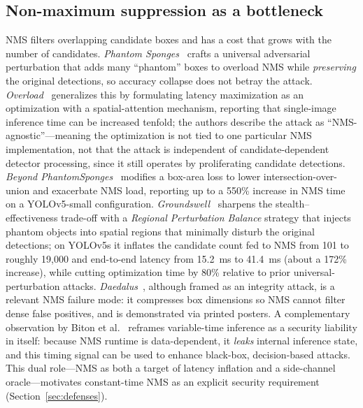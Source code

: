 \documentclass[acmsmall,screen,review,nonacm]{acmart}
\begin{document}
\subsection{Non-maximum suppression as a bottleneck}
NMS filters overlapping candidate boxes and has a cost that grows with the number of candidates. \emph{Phantom Sponges}~\cite{shapira2023phantom} crafts a universal adversarial perturbation that adds many ``phantom'' boxes to overload NMS while \emph{preserving} the original detections, so accuracy collapse does not betray the attack. \emph{Overload}~\cite{chen2024overload} generalizes this by formulating latency maximization as an optimization with a spatial-attention mechanism, reporting that single-image inference time can be increased tenfold; the authors describe the attack as ``NMS-agnostic''---meaning the optimization is not tied to one particular NMS implementation, not that the attack is independent of candidate-dependent detector processing, since it still operates by proliferating candidate detections. \emph{Beyond PhantomSponges}~\cite{schoof2024beyond} modifies a box-area loss to lower intersection-over-union and exacerbate NMS load, reporting up to a 550\% increase in NMS time on a YOLOv5-small configuration. \emph{Groundswell}~\cite{xia2026groundswell} sharpens the stealth--effectiveness trade-off with a \emph{Regional Perturbation Balance} strategy that injects phantom objects into spatial regions that minimally disturb the original detections; on YOLOv5s it inflates the candidate count fed to NMS from 101 to roughly 19{,}000 and end-to-end latency from 15.2~ms to 41.4~ms (about a 172\% increase), while cutting optimization time by 80\% relative to prior universal-perturbation attacks. \emph{Daedalus}~\cite{wang2019daedalus}, although framed as an integrity attack, is a relevant NMS failure mode: it compresses box dimensions so NMS cannot filter dense false positives, and is demonstrated via printed posters. A complementary observation by Biton et al.~\cite{biton2023timing} reframes variable-time inference as a security liability in itself: because NMS runtime is data-dependent, it \emph{leaks} internal inference state, and this timing signal can be used to enhance black-box, decision-based attacks. This dual role---NMS as both a target of latency inflation and a side-channel oracle---motivates constant-time NMS as an explicit security requirement (Section~\ref{sec:defenses}).
\end{document}
